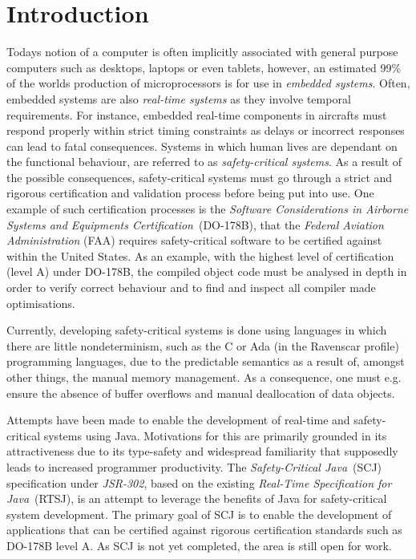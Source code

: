 \chapter{Introduction}
\label{chapter:introduction}
Todays notion of a computer is often implicitly associated with general purpose computers such as desktops, laptops or even tablets, however, an estimated 99\% of the worlds production of microprocessors is for use in \textit{embedded systems}\cite{alan2001real}. Often, embedded systems are also \textit{real-time systems} as they involve temporal requirements. For instance, embedded real-time components in aircrafts must respond properly within strict timing constraints as delays or incorrect responses can lead to fatal consequences. Systems in which human lives are dependant on the functional behaviour, are referred to as \textit{safety-critical systems}\cite{SCJSpec}. As a result of the possible consequences, safety-critical systems must go through a strict and rigorous certification and validation process before being put into use. One example of such certification processes is the \textit{Software Considerations in Airborne Systems and Equipments Certification}~(DO-178B)\cite{DO178B}, that the \textit{Federal Aviation Administration} (FAA) requires safety-critical software to be certified against within the United States. As an example, with the highest level of certification (level A) under DO-178B, the compiled object code must be analysed in depth in order to verify correct behaviour and to find and inspect all compiler made optimisations\cite{DO178B-Example}.
		
Currently, developing safety-critical systems is done using languages in which there are little nondeterminism, such as the C or Ada (in the Ravenscar profile) programming languages, due to the predictable semantics as a result of, amongst other things, the manual memory management. As a consequence, one must e.g. ensure the absence of buffer overflows and manual deallocation of data objects.

Attempts have been made to enable the development of real-time and safety-critical systems using Java. Motivations for this are primarily grounded in its attractiveness due to its type-safety and widespread familiarity that supposedly leads to increased programmer productivity\cite{henties:2009-20, Nilsen96issuesin}. The \textit{Safety-Critical Java}~(SCJ) specification under \textit{JSR-302}\cite{JSR, SCJSpec}, based on the existing \textit{Real-Time Specification for Java}~(RTSJ)\cite{RTSJSpec}, is an attempt to leverage the benefits of Java for safety-critical system development. The primary goal of SCJ is to enable the development of applications that can be certified against rigorous certification standards such as DO-178B level A. As SCJ is not yet completed, the area is still open for work.

